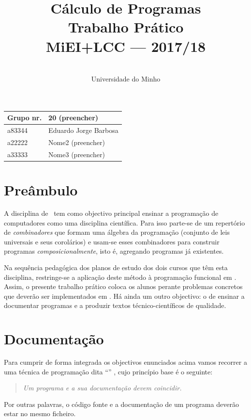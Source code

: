 \documentclass[a4paper]{article}
\title{
       	    Cálculo de Programas
\\
       	Trabalho Prático
\\
       	MiEI+LCC --- 2017/18
}
\author{
       	\dium
\\
       	Universidade do Minho
}
\date\mydate
\begin{document}
\maketitle

\begin{center}\large
\begin{tabular}{ll}
\textbf{Grupo} nr. & 20 (preencher)
\\\hline
a83344 & Eduardo Jorge Barbosa
\\
a22222 & Nome2 (preencher)
\\
a33333 & Nome3 (preencher)
\end{tabular}
\end{center}

\section{Preâmbulo}

A disciplina de \CP\ tem como objectivo principal ensinar
a progra\-mação de computadores como uma disciplina científica. Para isso
parte-se de um repertório de \emph{combinadores} que formam uma álgebra da
programação (conjunto de leis universais e seus corolários) e usam-se esses
combinadores para construir programas \emph{composicionalmente}, isto é,
agregando programas já existentes.

Na sequência pedagógica dos planos de estudo dos dois cursos que têm esta
disciplina, restringe-se a aplicação deste método à programação funcional
em \Haskell. Assim,
o presente trabalho prático coloca os alunos perante problemas
concretos que deverão ser implementados em \Haskell.
Há ainda um outro objectivo: o de ensinar a documentar programas e
a produzir textos técnico-científicos de qualidade.

\section{Documentação}
Para cumprir de forma integrada os objectivos enunciados acima vamos recorrer
a uma técnica de programa\-ção dita ``'' \cite{Kn92}, cujo
princípio base é o seguinte:
\begin{quote}\em
Um programa e a sua documentação devem coincidir.
\end{quote}
Por outras palavras, o código fonte e a documentação de um programa deverão estar no
mesmo ficheiro.
\end{document}
